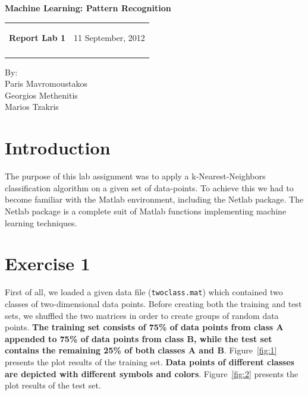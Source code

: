 \documentclass[letterpaper,11pt]{article}
\newcommand{\resheading}[1]{{\LARGE \colorbox{mygrey}{\begin{minipage}{\textwidth}{\textbf{#1 \vphantom{p\^{E}}}}\end{minipage}}}}
\begin{document}
\begin{center}
{\Large \textbf{Machine Learning: Pattern Recognition}}\\ [1em]
\end{center}
\newcommand{\mywebheader}{
    \begin{tabular}{@{}p{5.3in}p{4in}}
		{\resheading{{\LARGE Report Lab 1}}} & { {\Large 11 September, 2012}}\\\vspace{0.3cm}
	    \end{tabular}}
    \mywebheader
    
    	\begin{center}
    	{\Large By:} \\ \vspace{0.1cm}
	    {\Large Paris Mavromoustakos} \\  \vspace{0.1cm}
	    {\Large Georgios Methenitis} \\ \vspace{0.1cm}
	    {\Large Marios Tzakris}
	    \end{center}

  
  \section*{Introduction}
  The purpose of this lab assignment was to apply a k-Nearest-Neighbors classification algorithm on a given set of data-points. To achieve this we had to become familiar with the Matlab environment, including the Netlab package. The Netlab package is a complete suit of Matlab functions implementing machine learning techniques.
 
 \section*{Exercise 1}
 First of all, we loaded a given data file (\texttt{twoclass.mat}) which contained two classes of two-dimensional data points. Before creating both the training and test sets, we shuffled the two matrices in order to create groups of random data points. \textbf{The training set consists of 75\% of data points from class A appended to 75\% of data points from class B, while the test set contains the remaining 25\% of both classes A and B}. Figure~\ref{fig:1} presents the plot results of the training set. \textbf{Data points of different classes are depicted with different symbols and colors}. Figure~\ref{fig:2} presents the plot results of the test set.
 
\end{document}
